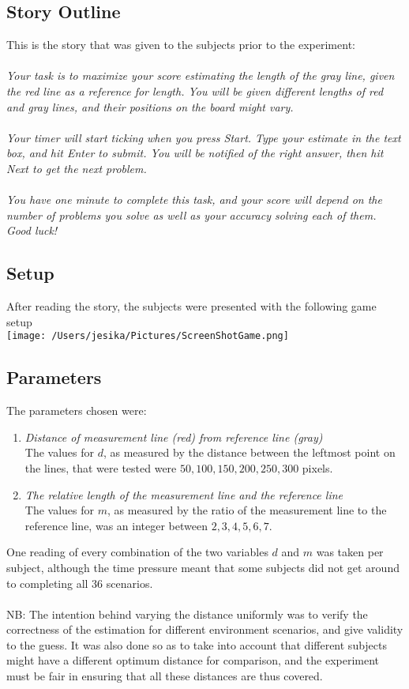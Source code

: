 \documentclass[12pt]{article}
\begin{document}
\subsection{Story Outline}
This is the story that was given to the subjects prior to the experiment: 
\\\\
\textit{
Your task is to maximize your score estimating the length of the gray line, given the red line as a reference for length. You will be given different lengths of red and gray lines, and their positions on the board might vary. 
\\\\Your timer will start ticking when you press Start. Type your estimate in the text box, and hit Enter to submit. You will be notified of the right answer, then hit Next to get the next problem. 
\\\\You have one minute to complete this task, and your score will depend on the number of problems you solve as well as your accuracy solving each of them. Good luck! 
}
\subsection{Setup}
After reading the story, the subjects were presented with the following game setup \\
\texttt{[image: /Users/jesika/Pictures/ScreenShotGame.png]}
\subsection{Parameters}
The parameters chosen were: 
\begin{enumerate}
\item \emph{Distance of measurement line (red) from reference line (gray)} 
\\ The values for $d$, as measured by the distance between the leftmost point on the lines, that were tested were $50,100,150,200,250,300$ pixels. 
\item \emph{The relative length of the measurement line and the reference line}
\\ The values for $m$, as measured by the ratio of the measurement line to the reference line, was an integer between $2, 3, 4, 5, 6, 7$.  
\end{enumerate}
One reading of every combination of the two variables $d$ and $m$ was taken per subject, although the time pressure meant that some subjects did not get around to completing all 36 scenarios. 
\\\\NB: The intention behind varying the distance uniformly was to verify the correctness of the estimation for different environment scenarios, and give validity to the guess. It was also done so as to take into account that different subjects might have a different optimum distance for comparison, and the experiment must be fair in ensuring that all these distances are thus covered. 
\end{document}
